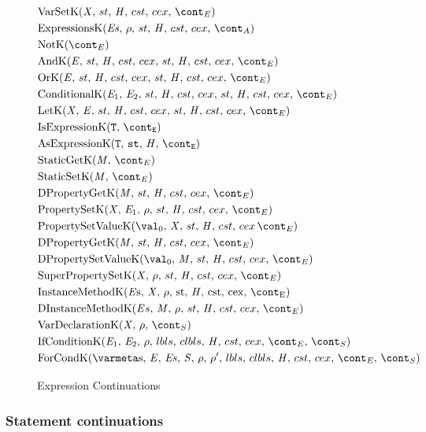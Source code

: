 \documentclass{article}
\begin{document}
\begin{figure}[Htp]
  \begin{align}
	&\VarSetK{\idmeta}{\ExceptionHandlers}{\econt} \label{econt:varset}\\
	&\ExpressionsK{\exprs}{\env}{\acont} \label{econt:expressions}\\
	&\NotK{\econt} \label{econt:not}\\
	&\AndK{\expressionmeta}{\ExceptionHandlers}{\econt} \label{econt:and}\\
	&\OrK{\expressionmeta}{\ExceptionHandlers}{\econt} \label{econt:or}\\
	&\ConditionalK{\expressionmeta_1}{\expressionmeta_2}{\ExceptionHandlers}{\econt} \label{econt:cond}\\
	&\LetK{\idmeta}{\expressionmeta}{\ExceptionHandlers}{\econt} \label{econt:let}\\
	&\IsExpressionK \label{econt:is}\\
	&\AsExpressionK \label{econt:as}\\
	&\StaticGetK \label{econt:static-get}\\
	&\StaticSetK \label{econt:static-set}\\
	&\DPropertyGetK \label{econt:dproperty-get}\\
	&\PropertySetK \label{econt:property-set}\\
	&\PropertySetVK \label{econt:property-set}\\
	&\DPropertyGetK \label{econt:dproperty-set}\\
	&\DPropertySetVK \label{econt:dproperty-set-v}\\
	&\SuperPropertySetK \label{econt:super-property-set}\\
	&\InstanceMethodK \label{econt:instance-method}\\
	&\DInstanceMethodK \label{econt:dinstance-method}\\
	&\VarDeclK{\idmeta}{\env}{\scont} \label{econt:var-decl}\\
	&\IfCondK{\expressionmeta_1}{\expressionmeta_2} \label{econt:if-cond}\\
	&\ForCondK \label{econt:for-cond}
  \end{align}
  \caption{Expression Continuations}
  \label{figure:econts}
\end{figure}

\subsubsection{Statement continuations}
\label{subsubsec:statement-continuations}
\end{document}
